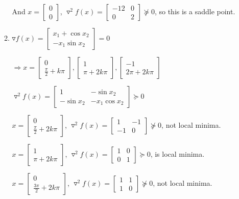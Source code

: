 \documentclass[12pt]{article}
\begin{document}
\begin{enumerate}
\begin{enumerate}
And $x = \begin{bmatrix} 0 \\ 0\end{bmatrix}$, $\triangledown^2 f(x) = \begin{bmatrix}-12 & 0 \\ 0 & 2 \end{bmatrix} \nsucceq 0$, so this is a saddle point.

\item
$\triangledown f(x) = \begin{bmatrix} x_1 + \cos x_2 \\ - x_1 \sin x_2  \end{bmatrix}=0 $

$\Longrightarrow x = \begin{bmatrix} 0 \\ \frac{\pi}{2} + k\pi \end{bmatrix}, \begin{bmatrix} 1 \\ \pi + 2k\pi \end{bmatrix}, \begin{bmatrix} -1 \\ 2 \pi + 2k\pi \end{bmatrix}$

$\triangledown ^2 f(x) = \begin{bmatrix} 1 & -\sin x_2 \\ -\sin x_2 & -x_1 \cos x_2 \end{bmatrix} \succeq 0$

$ x = \begin{bmatrix} 0 \\ \frac{\pi}{2} + 2k\pi \end{bmatrix}$, $\triangledown ^2 f(x) = \begin{bmatrix} 1 & -1 \\ -1 & 0 \end{bmatrix} \nsucceq 0$, not local minima.

$ x = \begin{bmatrix} 1 \\ \pi + 2k\pi \end{bmatrix}$, $\triangledown ^2 f(x) = \begin{bmatrix} 1 & 0 \\ 0 & 1 \end{bmatrix} \succeq 0$, is local minima.

$ x = \begin{bmatrix} 0 \\ \frac{3\pi}{2} + 2k\pi \end{bmatrix}$, $\triangledown ^2 f(x) = \begin{bmatrix} 1 & 1 \\ 1 & 0 \end{bmatrix} \nsucceq 0$, not local minima.


\end{enumerate}
\end{enumerate}
\end{document}
